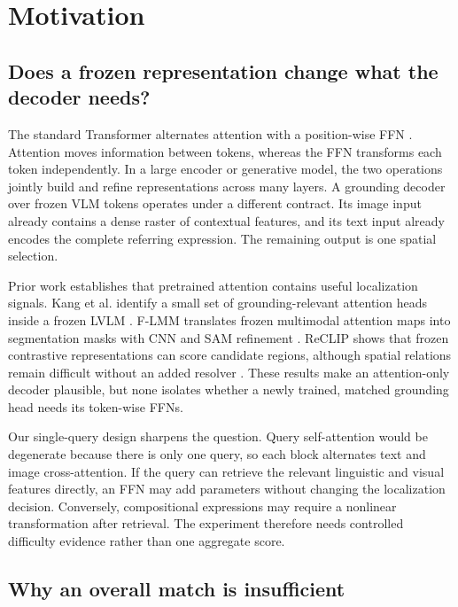 \documentclass[10pt]{article}
\begin{document}
\section{Motivation}\label{motivation}

\subsection{Does a frozen representation change what the decoder needs?}\label{does-a-frozen-representation-change-what-the-decoder-needs}

The standard Transformer alternates attention with a position-wise FFN
\citep{vaswani2017attention}. Attention moves information between tokens,
whereas the FFN transforms each token independently. In a large encoder or
generative model, the two operations jointly build and refine representations
across many layers. A grounding decoder over frozen VLM tokens operates under a
different contract. Its image input already contains a dense raster of
contextual features, and its text input already encodes the complete referring
expression. The remaining output is one spatial selection.

Prior work establishes that pretrained attention contains useful localization
signals. Kang et al. identify a small set of grounding-relevant attention heads
inside a frozen LVLM \citep{kang2025heads}. F-LMM translates frozen multimodal
attention maps into segmentation masks with CNN and SAM refinement
\citep{wu2025flmm}. ReCLIP shows that frozen contrastive representations can
score candidate regions, although spatial relations remain difficult without
an added resolver \citep{subramanian2022reclip}. These results make an
attention-only decoder plausible, but none isolates whether a newly trained,
matched grounding head needs its token-wise FFNs.

Our single-query design sharpens the question. Query self-attention would be
degenerate because there is only one query, so each block alternates text and
image cross-attention. If the query can retrieve the relevant linguistic and
visual features directly, an FFN may add parameters without changing the
localization decision. Conversely, compositional expressions may require a
nonlinear transformation after retrieval. The experiment therefore needs
controlled difficulty evidence rather than one aggregate score.

\subsection{Why an overall match is insufficient}\label{why-an-overall-match-is-insufficient}
\end{document}
